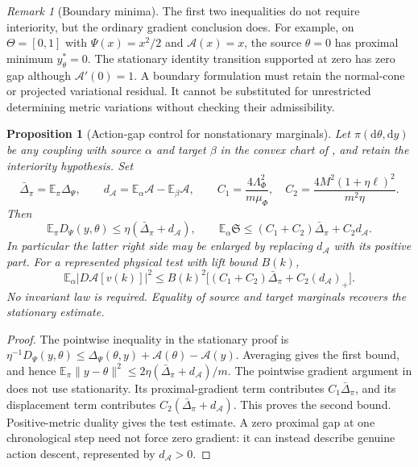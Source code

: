 \documentclass[11pt]{article}
\numberwithin{equation}{section}
\newtheorem{proposition}[proposition]{Proposition}
\theoremstyle{definition}
\theoremstyle{remark}
\newtheorem{remark}[remark]{Remark}
\newcommand{\dd}{\mathrm d}
\begin{document}
\begin{remark}[Boundary minima]
The first two inequalities do not require interiority, but the ordinary
gradient conclusion does.  For example, on $\Theta=[0,1]$ with
$\Psi(x)=x^2/2$ and $\mathcal A(x)=x$, the source $\theta=0$ has proximal
minimum $y_\theta^*=0$.  The stationary identity transition supported at zero
has zero gap although $\mathcal A'(0)=1$.  A boundary formulation must retain
the normal-cone or projected variational residual.  It cannot be substituted
for unrestricted determining metric variations without checking their
admissibility.
\end{remark}

\begin{proposition}[Action-gap control for nonstationary marginals]
\label{prop:supp-nonstationary-action-gap}
Let $\pi(\dd\theta,\dd y)$ be any coupling with source $\alpha$ and target
$\beta$ in the convex chart of , and
retain the interiority hypothesis.  Set
\[
 \bar\Delta_\pi=\mathbb E_\pi\Delta_\Psi,\qquad
 d_{\mathcal A}=\mathbb E_\alpha\mathcal A-
                         \mathbb E_\beta\mathcal A,
 \qquad
 C_1=\frac{4\Lambda_\Phi^2}{m\mu_\Phi},\quad
 C_2=\frac{4M^2(1+\eta\ell)^2}{m^2\eta}.
\]
Then
\begin{equation}
 \mathbb E_\pi D_\Psi(y,\theta)
 \le\eta(\bar\Delta_\pi+d_{\mathcal A}),\qquad
 \mathbb E_\alpha\mathfrak S
 \le(C_1+C_2)\bar\Delta_\pi+C_2d_{\mathcal A}.
 \label{eq:supp-nonstationary-gap}
\end{equation}
In particular the latter right side may be enlarged by replacing
$d_{\mathcal A}$ with its positive part.  For a represented physical test
with lift bound $B(k)$,
\begin{equation}
 \mathbb E_\alpha|D\mathcal A[v(k)]|^2
 \le B(k)^2\bigl[(C_1+C_2)\bar\Delta_\pi+C_2(d_{\mathcal A})_+\bigr].
 \label{eq:supp-nonstationary-test}
\end{equation}
No invariant law is required.  Equality of source and target marginals
recovers the stationary estimate.
\end{proposition}
\begin{proof}
The pointwise inequality in the stationary proof is
$\eta^{-1}D_\Psi(y,\theta)\le
\Delta_\Psi(\theta,y)+\mathcal A(\theta)-\mathcal A(y)$.
Averaging gives the first bound, and hence
$\mathbb E_\pi\|y-\theta\|^2\le
2\eta(\bar\Delta_\pi+d_{\mathcal A})/m$.
The pointwise gradient argument in
 does not use stationarity.  Its
proximal-gradient term contributes $C_1\bar\Delta_\pi$, and its
displacement term contributes $C_2(\bar\Delta_\pi+d_{\mathcal A})$.
This proves the second bound.  Positive-metric duality gives the test
estimate.  A zero proximal gap at one chronological step need not force
zero gradient: it can instead describe genuine action descent, represented
by $d_{\mathcal A}>0$.
\end{proof}
\end{document}
